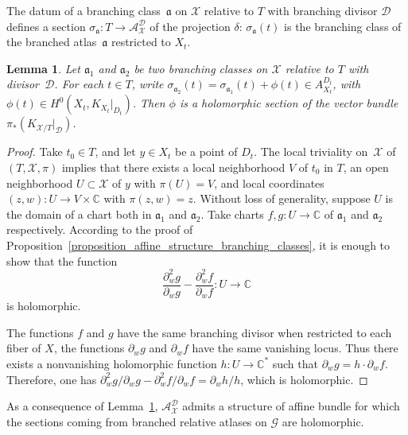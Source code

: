 \documentclass[JEP,XML,SOM,Unicode,NoEqCountersInSection,published]{cedram}
\theoremstyle{definition}
\theoremstyle{plain}
\newtheorem{lemma}[definition]{Lemma}
\begin{document}
The datum of a branching class~$\mathfrak a$ on $\mathcal X$ relative to $T$ with branching divisor $\mathcal D$ defines a section $\sigma_{\mathfrak a}: T \to \mathcal A_{\mathcal X}^{\mathcal D}$ of the projection $\delta$: $\sigma_{\mathfrak a}(t)$ is the branching class of the branched atlas~$\mathfrak a$ restricted to $X_t$.

\begin{lemma}\label{lemma_diff_atlas_proj}
Let $\mathfrak a_1$ and $\mathfrak a_2$ be two branching classes on $\mathcal X$ relative to $T$ with divisor~$\mathcal D$.
For each $t \!\in\! T$, write $\sigma_{\mathfrak a_2}(t) \!=\! \sigma_{\mathfrak a_1}(t) + \phi(t) \!\in\! A_{X_t}^{D_t}$, with $\phi(t) \!\in\! H^0(X_t, K_{X_t}|_{D_t})$.
Then $\phi$ is a holomorphic section of the vector bundle $\pi_*(K_{\mathcal X/T}|_{\mathcal D})$.
\end{lemma}

\begin{proof}
Take $t_0 \in T$, and let $y \in X_t$ be a point of $D_t$.
The local triviality on~$\mathcal X$ of $(T, \mathcal X, \pi)$ implies that there exists a local neighborhood $V$ of $t_0$ in $T$, an open neighborhood $U \subset \mathcal X$ of $y$ with $\pi(U) = V$, and local coordinates $(z, w): U \to V \times \mathbb C$ with $\pi(z, w) = z$.
Without loss of generality, suppose $U$ is the domain of a chart both in $\mathfrak a_1$ and $\mathfrak a_2$.
Take charts $f, g: U \to \mathbb C$ of $\mathfrak a_1$ and $\mathfrak a_2$ respectively.
According to the proof of Proposition~\ref{proposition_affine_structure_branching_classes}, it is enough to show that the function
\[
\frac{\partial^2_w g}{\partial_w g} - \frac{\partial^2_w f}{\partial_w f}: U \to \mathbb C
\]
is holomorphic.

The functions $f$ and $g$ have the same branching divisor when restricted to each fiber of $X$, \ie the functions $\partial_w g$ and $\partial_w f$ have the same vanishing locus.
Thus there exists a nonvanishing holomorphic function $h: U \to \mathbb C^*$ such that $\partial_w g = h \cdot \partial_w f$.
Therefore, one has $\partial^2_w g /\partial_w g - \partial^2_w f / \partial_w f = \partial_w h / h$, which is holomorphic.
\end{proof}

As a consequence of Lemma~\ref{lemma_diff_atlas_proj}, $\mathcal A_{\mathcal X}^{\mathcal D}$ admits a structure of affine bundle for which the sections coming from branched relative atlases on $\mathcal G$ are holomorphic.
\end{document}
